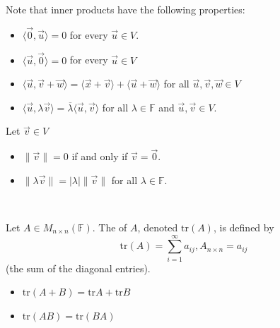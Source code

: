 \documentclass[11pt,fleqn]{book} %
\begin{document}
Note that inner products have the following properties: 

\begin{itemize}
    \item $\langle \vec{0}, \vec{u} \rangle = 0$ for every $\vec{u} \in V$. 
    \item $\langle \vec{u}, \vec{0} \rangle = 0$ for every $\vec{u} \in V$
    \item $\langle \vec{u}, \vec{v} + \vec{w} \rangle = \langle \vec{x} + \vec{v} \rangle + \langle \vec{u} + \vec{w} \rangle$ for all $\vec{u}, \vec{v}, \vec{w} \in V$
    \item $\langle \vec{u}, \lambda \vec{v} \rangle = \overline{\lambda}\langle \vec{u}, \vec{v} \rangle$ for all $\lambda \in \mathbb{F}$ and $\vec{u}, \vec{v} \in V$. 
\end{itemize}

Let $\vec{v} \in V$
\begin{itemize}
    \item $\|\vec{v}\| = 0$ if and only if $\vec{v} = \vec{0}$.
    \item $\|\lambda\vec{v}\| = |\lambda|\|\vec{v}\|$ for all $\lambda \in \mathbb{F}$. 
\end{itemize}

\setcounter{section}{0}
\setcounter{definitionT}{2}
\begin{definition}[Trace]
{~~~}

    Let $A \in M_{n \times n}(\mathbb{F})$. The  of $A$, denoted $\mathrm{tr}(A)$, is defined by $$\mathrm{tr}(A) = \sum_{i=1}^\infty a_{ij}, A_{n \times n} = a_{ij}$$ (the sum of the diagonal entries). 
\end{definition}
\setcounter{section}{3}
\begin{itemize}
    \item $\mathrm{tr}(A + B) = \mathrm{tr}A + \mathrm{tr}B$
    \item $\mathrm{tr}(AB) = \mathrm{tr}(BA)$    
\end{itemize}
\end{document}
